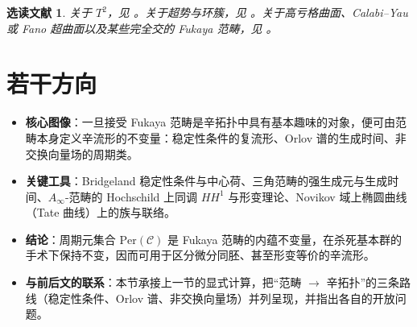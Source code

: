 \documentclass[11pt,a4paper]{article}
\numberwithin{equation}{section}
\newtheorem*{Notes}{选读文献}
\newcommand{\bZ}{\mathbb{Z}}
\newcommand{\scrF}{\EuScript{F}}
\newcommand{\CC}{\mathcal{C}}
\begin{document}


\begin{Notes} 关于 $T^2$，见 \cite{PolishchukZaslow, PZ2, LekiliPerutz, LekiliPerutz2}。关于超势与环簇，见 \cite{Auroux:slag, Cho, Cho-Oh, FO3:toric, RitterSmith, Woodward}。关于高亏格曲面、Calabi--Yau 或 Fano 超曲面以及某些完全交的 Fukaya 范畴，见 \cite{Efimov, Sheridan2, Sheridan3, Smith:HFQuadrics}。
\end{Notes}




\section{若干方向}\label{Sec:Further}

\begin{keypoints}
\begin{itemize}
  \item \textbf{核心图像}：一旦接受 Fukaya 范畴是辛拓扑中具有基本趣味的对象，便可由范畴本身定义辛流形的不变量：稳定性条件的复流形、Orlov 谱的生成时间、非交换向量场的周期类。
  \item \textbf{关键工具}：Bridgeland 稳定性条件与中心荷、三角范畴的强生成元与生成时间、$A_\infty$-范畴的 Hochschild 上同调 $HH^1$ 与形变理论、Novikov 域上椭圆曲线（Tate 曲线）上的族与联络。
  \item \textbf{结论}：周期元集合 $\mathrm{Per}(\CC)$ 是 Fukaya 范畴的内蕴不变量，在杀死基本群的手术下保持不变，因而可用于区分微分同胚、甚至形变等价的辛流形。
  \item \textbf{与前后文的联系}：本节承接上一节的显式计算，把“范畴 $\to$ 辛拓扑”的三条路线（稳定性条件、Orlov 谱、非交换向量场）并列呈现，并指出各自的开放问题。
\end{itemize}
\end{keypoints}
\end{document}
